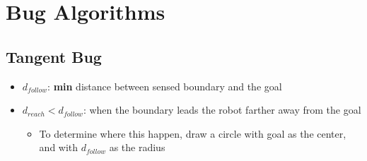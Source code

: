 \chapter{Bug Algorithms}

  \section{Tangent Bug}

    \begin{itemize}
      \item $ d_{follow} $: \textbf{min} distance between sensed boundary and
      the goal
      \item $ d_{reach} < d_{follow} $: when the boundary leads the robot
      farther away from the goal
      \begin{itemize}
        \item To determine where this happen, draw a circle with goal as
        the center, and with $ d_{follow} $ as the radius
      \end{itemize}
    \end{itemize}
